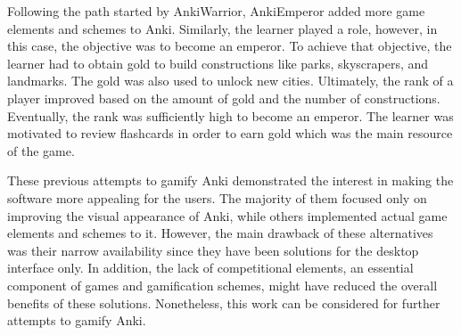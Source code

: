 Following the path started by AnkiWarrior, AnkiEmperor \citep{proxx2012emperor} added more game elements and schemes to Anki. Similarly, the learner played a role, however, in this case, the objective was to become an emperor. To achieve that objective, the learner had to obtain gold to build constructions like parks, skyscrapers, and landmarks. The gold was also used to unlock new cities. Ultimately, the rank of a player improved based on the amount of gold and the number of constructions. Eventually, the rank was sufficiently high to become an emperor. The learner was motivated to review flashcards in order to earn gold which was the main resource of the game.

These previous attempts to gamify Anki demonstrated the interest in making the software more appealing for the users. The majority of them focused only on improving the visual appearance of Anki, while others implemented actual game elements and schemes to it. However, the main drawback of these alternatives was their narrow availability since they have been solutions for the desktop interface only. In addition, the lack of competitional elements, an essential component of games and gamification schemes, might have reduced the overall benefits of these solutions. Nonetheless, this work can be considered for further attempts to gamify Anki.
